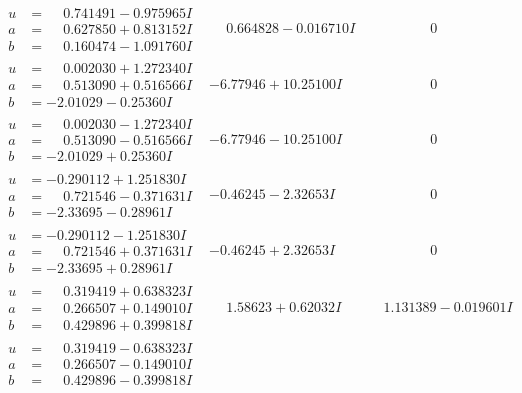 \documentclass[1p]{elsarticle_modified}
\theoremstyle{definition}
\begin{document}
$$\begin{array}{c|c|c}
\begin{aligned}
u &= \phantom{-}0.741491 - 0.975965 I \\
a &= \phantom{-}0.627850 + 0.813152 I \\
b &= \phantom{-}0.160474 - 1.091760 I\end{aligned}
 & \phantom{-}0.664828 - 0.016710 I & \phantom{-0.000000 } 0 \\ \hline\begin{aligned}
u &= \phantom{-}0.002030 + 1.272340 I \\
a &= \phantom{-}0.513090 + 0.516566 I \\
b &= -2.01029 - 0.25360 I\end{aligned}
 & -6.77946 + 10.25100 I & \phantom{-0.000000 } 0 \\ \hline\begin{aligned}
u &= \phantom{-}0.002030 - 1.272340 I \\
a &= \phantom{-}0.513090 - 0.516566 I \\
b &= -2.01029 + 0.25360 I\end{aligned}
 & -6.77946 - 10.25100 I & \phantom{-0.000000 } 0 \\ \hline\begin{aligned}
u &= -0.290112 + 1.251830 I \\
a &= \phantom{-}0.721546 - 0.371631 I \\
b &= -2.33695 - 0.28961 I\end{aligned}
 & -0.46245 - 2.32653 I & \phantom{-0.000000 } 0 \\ \hline\begin{aligned}
u &= -0.290112 - 1.251830 I \\
a &= \phantom{-}0.721546 + 0.371631 I \\
b &= -2.33695 + 0.28961 I\end{aligned}
 & -0.46245 + 2.32653 I & \phantom{-0.000000 } 0 \\ \hline\begin{aligned}
u &= \phantom{-}0.319419 + 0.638323 I \\
a &= \phantom{-}0.266507 + 0.149010 I \\
b &= \phantom{-}0.429896 + 0.399818 I\end{aligned}
 & \phantom{-}1.58623 + 0.62032 I & \phantom{-}1.131389 - 0.019601 I \\ \hline\begin{aligned}
u &= \phantom{-}0.319419 - 0.638323 I \\
a &= \phantom{-}0.266507 - 0.149010 I \\
b &= \phantom{-}0.429896 - 0.399818 I\end{aligned}

\end{array}$$
\end{document}
